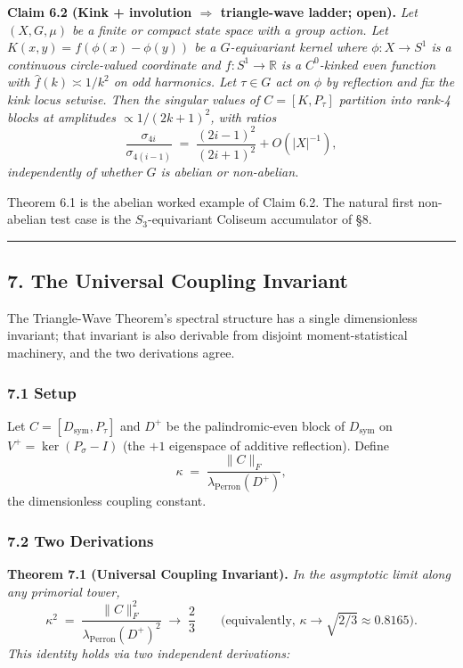 \documentclass[
  11pt,
]{article}
\begin{document}
\textbf{Claim 6.2 (Kink + involution \(\Rightarrow\) triangle-wave
ladder; open).} \emph{Let \((X, G, \mu)\) be a finite or compact state
space with a group action. Let \(K(x, y) = f(\phi(x) - \phi(y))\) be a
\(G\)-equivariant kernel where \(\phi : X \to S^1\) is a continuous
circle-valued coordinate and \(f : S^1 \to \mathbb{R}\) is a
\(C^0\)-kinked even function with \(\hat f(k) \asymp 1/k^2\) on odd
harmonics. Let \(\tau \in G\) act on \(\phi\) by reflection and fix the
kink locus setwise. Then the singular values of \(C = [K, P_\tau]\)
partition into rank-4 blocks at amplitudes \(\propto 1/(2k+1)^2\), with
ratios}
\[\frac{\sigma_{4i}}{\sigma_{4(i-1)}} \;=\; \frac{(2i-1)^2}{(2i+1)^2} + O(|X|^{-1}),\]
\emph{independently of whether \(G\) is abelian or non-abelian.}

Theorem 6.1 is the abelian worked example of Claim 6.2. The natural
first non-abelian test case is the \(S_3\)-equivariant Coliseum
accumulator of §8.

\begin{center}\rule{0.5\linewidth}{0.5pt}\end{center}

\subsection{7. The Universal Coupling
Invariant}\label{the-universal-coupling-invariant}

The Triangle-Wave Theorem's spectral structure has a single
dimensionless invariant; that invariant is also derivable from disjoint
moment-statistical machinery, and the two derivations agree.

\subsubsection{7.1 Setup}\label{setup-2}

Let \(C = [D_\text{sym}, P_\tau]\) and \(D^+\) be the palindromic-even
block of \(D_\text{sym}\) on \(V^+ = \ker(P_\sigma - I)\) (the \(+1\)
eigenspace of additive reflection). Define
\[\kappa \;=\; \frac{\|C\|_F}{\lambda_\text{Perron}(D^+)}, \tag{7.1}\]
the dimensionless coupling constant.

\subsubsection{7.2 Two Derivations}\label{two-derivations}

\textbf{Theorem 7.1 (Universal Coupling Invariant).} \emph{In the
asymptotic limit along any primorial tower,}
\[\kappa^2 \;=\; \frac{\|C\|_F^2}{\lambda_\text{Perron}(D^+)^2} \;\to\; \frac{2}{3} \qquad \text{(equivalently, } \kappa \to \sqrt{2/3} \approx 0.8165\text{).} \tag{7.2}\]
\emph{This identity holds via two independent derivations:}
\end{document}
